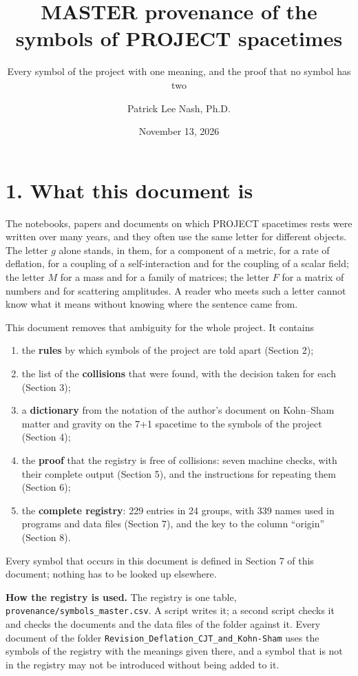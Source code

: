 \documentclass[
  10pt,
]{article}
\title{MASTER provenance of the symbols of PROJECT spacetimes}
\subtitle{Every symbol of the project with one meaning, and the proof
that no symbol has two}
\author{Patrick Lee Nash, Ph.D.}
\date{November 13, 2026}
\providecommand{\tightlist}{%
  \setlength{\itemsep}{0pt}\setlength{\parskip}{0pt}}
\begin{document}
\maketitle

\hypertarget{what-this-document-is}{%
\section{1. What this document is}\label{what-this-document-is}}

The notebooks, papers and documents on which PROJECT spacetimes rests
were written over many years, and they often use the same letter for
different objects. The letter \(g\) alone stands, in them, for a
component of a metric, for a rate of deflation, for a coupling of a
self-interaction and for the coupling of a scalar field; the letter
\(M\) for a mass and for a family of matrices; the letter \(F\) for a
matrix of numbers and for scattering amplitudes. A reader who meets such
a letter cannot know what it means without knowing where the sentence
came from.

This document removes that ambiguity for the whole project. It contains

\begin{enumerate}
\def\labelenumi{\arabic{enumi}.}
\tightlist
\item
  the \textbf{rules} by which symbols of the project are told apart
  (Section 2);
\item
  the list of the \textbf{collisions} that were found, with the decision
  taken for each (Section 3);
\item
  a \textbf{dictionary} from the notation of the author's document on
  Kohn--Sham matter and gravity on the 7+1 spacetime to the symbols of
  the project (Section 4);
\item
  the \textbf{proof} that the registry is free of collisions: seven
  machine checks, with their complete output (Section 5), and the
  instructions for repeating them (Section 6);
\item
  the \textbf{complete registry}: 229 entries in 24 groups, with 339
  names used in programs and data files (Section 7), and the key to the
  column ``origin'' (Section 8).
\end{enumerate}

Every symbol that occurs in this document is defined in Section 7 of
this document; nothing has to be looked up elsewhere.

\textbf{How the registry is used.} The registry is one table,
\texttt{provenance/symbols\_master.csv}. A script writes it; a second
script checks it and checks the documents and the data files of the
folder against it. Every document of the folder
\texttt{Revision\_Deflation\_CJT\_and\_Kohn-Sham} uses the symbols of
the registry with the meanings given there, and a symbol that is not in
the registry may not be introduced without being added to it.
\end{document}
